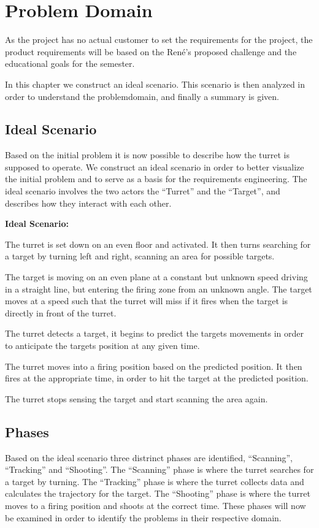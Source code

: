 \chapter{Problem Domain}
As the project has no actual customer to set the requirements for the project,
the product requirements will be based on the Ren\'e's proposed challenge and
the educational goals for the semester.\nl

In this chapter we construct an ideal scenario. This scenario is then analyzed in order to
understand the problemdomain, and finally a summary is given.

\section{Ideal Scenario}
Based on the initial problem it is now possible to describe how the turret is
supposed to operate. We construct an ideal scenario in order to better
visualize the initial problem and to serve as a basis for the requirements engineering.
The ideal scenario involves the two actors the ``Turret'' and the ``Target'',
 and
describes how they interact with each other.

\begin{center}
\colorbox{diff}{
\begin{minipage}{0.8\linewidth}
\textbf{Ideal Scenario:}

The turret is set down on an even floor and activated. It then turns searching
for a target by turning left and right, scanning an area for possible
targets.\nl

The target is moving on an even plane at a constant but unknown speed driving
in a straight line, but entering the firing zone from an unknown angle. The
target moves at a speed such that the turret will miss if it fires when the
target is directly in front of the turret.\nl

The turret detects a target, it begins to predict the targets movements in
order to anticipate the targets position at any given time.\nl

The turret moves into a firing position based on the predicted position. It then
fires at the appropriate time, in order to hit the target at the predicted
position.\nl

The turret stops sensing the target and start scanning the area again.
\end{minipage}
}
\end{center}


\section{Phases}
Based on the ideal scenario three distrinct phases are identified,
``Scanning'', ``Tracking'' and ``Shooting''. The ``Scanning'' phase is where
the turret searches for a target by turning. The ``Tracking'' phase is where the
turret collects data and calculates the trajectory for the target. The
``Shooting'' phase is where the turret moves to a firing position and shoots at
the correct time. These phases will now be examined in order to identify the
problems in their respective domain.

